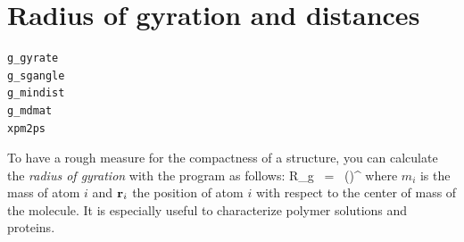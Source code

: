 \section{Radius of gyration and distances}
\label{sec:rg}
\begin{verbatim}
g_gyrate
g_sgangle
g_mindist
g_mdmat
xpm2ps
\end{verbatim}
To have a rough measure for the compactness of a structure, you can calculate 
the {\em radius of gyration} with the program {\tt {}} as follows:
\beq
R_g ~=~ \left({}\right)^{\half}
\label{eqn:rg}
\eeq
where $m_i$ is the mass of atom $i$ and ${\bf r}_i$ the position of 
atom $i$ with respect to the center of mass of the molecule. It is especially 
useful to characterize polymer solutions and proteins.

